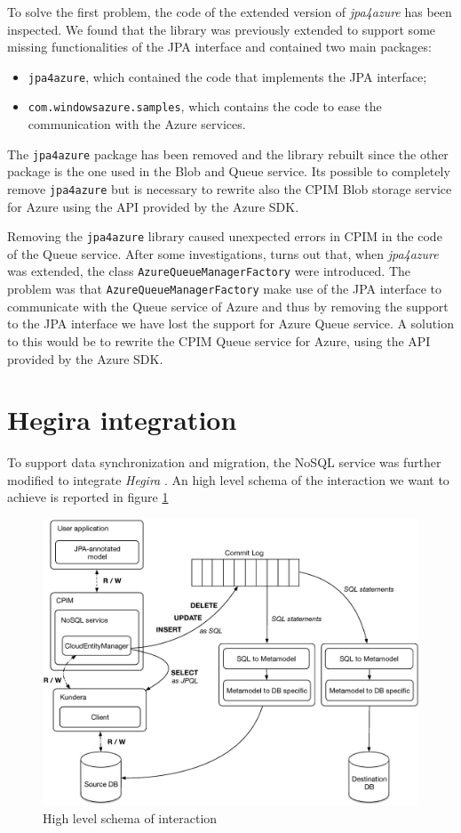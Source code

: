 \noindent To solve the first problem, the code of the extended version of \textit{jpa4azure} has been inspected. We found that the library was previously extended to support some missing functionalities of the JPA interface and contained two main packages:
\begin{itemize}
\item \texttt{jpa4azure}, which contained the code that implements the JPA interface;
\item \texttt{com.windowsazure.samples}, which contains the code to ease the communication with the Azure services.
\end{itemize}
The \texttt{jpa4azure} package has been removed and the library rebuilt since the other package is the one used in the Blob and Queue service. Its possible to completely remove \texttt{jpa4azure} but is necessary to rewrite also the CPIM Blob storage service for Azure using the API provided by the Azure SDK.

\newparagraph Removing the \texttt{jpa4azure} library caused unexpected errors in CPIM in the code of the Queue service. After some investigations, turns out that, when \textit{jpa4azure} was extended, the class \texttt{AzureQueueManagerFactory} were introduced.
The problem was that \texttt{AzureQueueManagerFactory} make use of the JPA interface to communicate with the Queue service of Azure and thus by removing the support to the JPA interface we have lost the support for Azure Queue service.
A solution to this would be to rewrite the CPIM Queue service for Azure, using the API provided by the Azure SDK.

\section{Hegira integration}
\label{sec:hegira}
To support data synchronization and migration, the NoSQL service was further modified to integrate \textit{Hegira} \cite{thesis:marco}. An high level schema of the interaction we want to achieve is reported in figure \ref{fig:high-level-interaction}

\begin{figure}[tbh]
  \centering
  \includegraphics[width=12cm]{images/high_level_interaction}
  \caption{High level schema of interaction}
  \label{fig:high-level-interaction}
\end{figure} 

